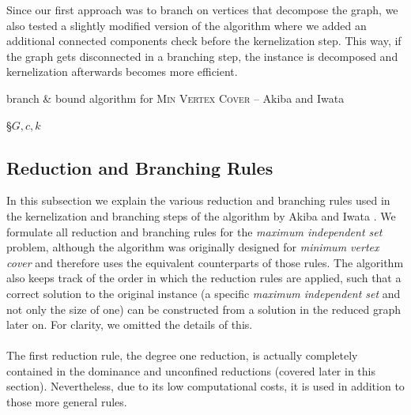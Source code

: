 \documentclass[]{article}
\begin{document}
Since our first approach was to branch on vertices that decompose the graph, we also tested a slightly modified version of the algorithm where we added an additional connected components check before the kernelization step. This way, if the graph gets disconnected in a branching step, the instance is decomposed and kernelization afterwards becomes more efficient.

\begin{algorithm}
	\caption{branch \& bound algorithm for \textsc{Min Vertex Cover} -- Akiba and Iwata \cite{AkibaIwata}}\label{alg:bb}
	\DontPrintSemicolon
	
	\S{$G,c,k$}
	
		
\end{algorithm}
\newpage
\subsection{Reduction and Branching Rules} \label{red}

In this subsection we explain the various reduction and branching rules used in the kernelization and branching steps of the algorithm by Akiba and Iwata \cite{AkibaIwata}. We formulate all reduction and branching rules for the \textit{maximum independent set} problem, although the algorithm was originally designed for \textit{minimum vertex cover} and therefore uses the equivalent counterparts of those rules. The algorithm also keeps track of the order in which the reduction rules are applied, such that a correct solution to the original instance (a specific \textit{maximum independent set} and not only the size of one) can be constructed from a solution in the reduced graph later on. For clarity, we omitted the details of this.
\\\\
The first reduction rule, the degree one reduction, is actually completely contained in the dominance and unconfined reductions (covered later in this section). 
Nevertheless, due to its low computational costs, it is used in addition to those more general rules. 
\end{document}
